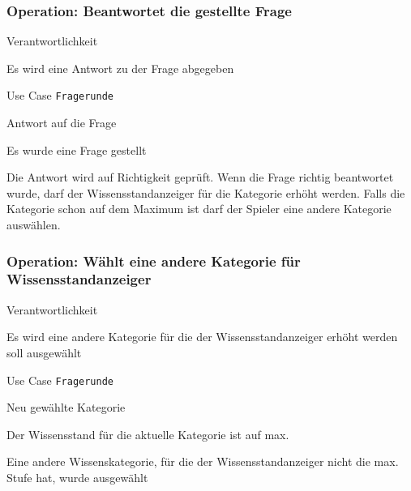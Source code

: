\subsubsection{Operation: Beantwortet die gestellte Frage}
\begin{labeling}[:]{Verantwortlichkeit}
\item [Verantwortlichkeit] Es wird eine Antwort zu der Frage abgegeben
\item [Referenzen] Use Case \texttt{Fragerunde}
\item [Output] Antwort auf die Frage
\item [Vorbedingungen] Es wurde eine Frage gestellt
\item [Nachbedingungen] Die Antwort wird auf Richtigkeit geprüft. Wenn die Frage richtig beantwortet wurde, darf der Wissensstandanzeiger für die Kategorie erhöht werden. Falls die Kategorie schon auf dem Maximum ist darf der Spieler eine andere Kategorie auswählen.
\end{labeling}

\subsubsection{Operation: Wählt eine andere Kategorie für Wissensstandanzeiger}
\begin{labeling}[:]{Verantwortlichkeit}
\item [Verantwortlichkeit] Es wird eine andere Kategorie für die der Wissensstandanzeiger erhöht werden soll ausgewählt
\item [Referenzen] Use Case \texttt{Fragerunde}
\item [Output] Neu gewählte Kategorie
\item [Vorbedingungen] Der Wissensstand für die aktuelle Kategorie ist auf max.
\item [Nachbedingungen] Eine andere Wissenskategorie, für die der Wissensstandanzeiger nicht die max. Stufe hat, wurde ausgewählt
\end{labeling}
